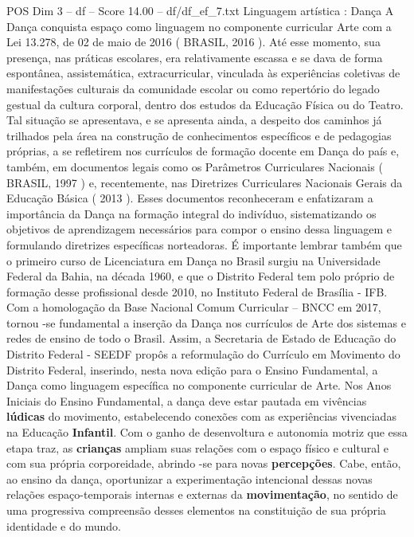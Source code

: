 \begin{textsample}{POS Dim 3 – df – Score 14.00 – df/df\_ef\_7.txt}  \label{ex:f3_pos_127}
Linguagem artística : Dança A Dança conquista espaço como linguagem no componente curricular Arte com a Lei 13.278, de 02 de maio de 2016 ( BRASIL, 2016 ).
Até esse momento, sua presença, nas práticas escolares, era relativamente escassa e se dava de forma espontânea, assistemática, extracurricular, vinculada às experiências coletivas de manifestações culturais da comunidade escolar ou como repertório do legado gestual da cultura corporal, dentro dos estudos da Educação Física ou do Teatro.
Tal situação se apresentava, e se apresenta ainda, a despeito dos caminhos já trilhados pela área na construção de conhecimentos específicos e de pedagogias próprias, a se refletirem nos currículos de formação docente em Dança do país e, também, em documentos legais como os Parâmetros Curriculares Nacionais ( BRASIL, 1997 ) e, recentemente, nas Diretrizes Curriculares Nacionais Gerais da Educação Básica ( 2013 ).
Esses documentos reconheceram e enfatizaram a importância da Dança na formação integral do indivíduo, sistematizando os objetivos de aprendizagem necessários para compor o ensino dessa linguagem e formulando diretrizes específicas norteadoras.
É importante lembrar também que o primeiro curso de Licenciatura em Dança no Brasil surgiu na Universidade Federal da Bahia, na década 1960, e que o Distrito Federal tem polo próprio de formação desse profissional desde 2010, no Instituto Federal de Brasília - IFB.
Com a homologação da Base Nacional Comum Curricular – BNCC em 2017, tornou -se fundamental a inserção da Dança nos currículos de Arte dos sistemas e redes de ensino de todo o Brasil.
Assim, a Secretaria de Estado de Educação do Distrito Federal - SEEDF propôs a reformulação do Currículo em Movimento do Distrito Federal, inserindo, nesta nova edição para o Ensino Fundamental, a Dança como linguagem específica no componente curricular de Arte.
Nos Anos Iniciais do Ensino Fundamental, a dança deve estar pautada em vivências \textbf{lúdicas} do movimento, estabelecendo conexões com as experiências vivenciadas na Educação \textbf{Infantil}.
Com o ganho de desenvoltura e autonomia motriz que essa etapa traz, as \textbf{crianças} ampliam suas relações com o espaço físico e cultural e com sua própria corporeidade, abrindo -se para novas \textbf{percepções}.
Cabe, então, ao ensino da dança, oportunizar a experimentação intencional dessas novas relações espaço-temporais internas e externas da \textbf{movimentação}, no sentido de uma progressiva compreensão desses elementos na constituição de sua própria identidade e do mundo.

\end{textsample}
